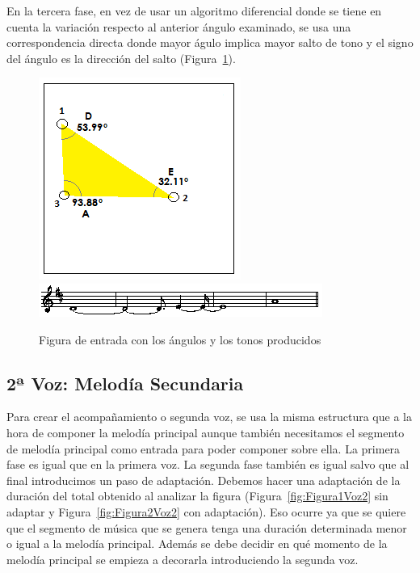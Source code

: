 En la tercera fase, en vez de usar un algoritmo diferencial donde se tiene en cuenta la variación respecto al anterior ángulo examinado, se usa una correspondencia directa donde mayor águlo implica mayor salto de tono y el signo del ángulo es la dirección del salto (Figura~\ref{fig:Figura6Voz1}).

		\begin{figure}[htbp]
		\centering
		\hspace*{0.0in}
		\includegraphics[scale=1]{graphics/simpletest1-F3_2.png}
		\includegraphics[scale=1]{graphics/simpletest1_2-MELpartitura.png}
		\caption{Figura de entrada con los ángulos y los tonos producidos}
		\label{fig:Figura6Voz1}
		\end{figure}


\subsection{2ª Voz: Melodía Secundaria}

Para crear el acompañamiento o segunda voz, se usa la misma estructura que a la hora de componer la melodía principal aunque también necesitamos el segmento de melodía principal como entrada para poder componer sobre ella. 
La primera fase es igual que en la primera voz. La segunda fase también es igual salvo que al final introducimos un paso de adaptación. Debemos hacer una adaptación de la duración del total obtenido al analizar la figura (Figura~\ref{fig:Figura1Voz2} sin adaptar y Figura~\ref{fig:Figura2Voz2} con adaptación). Eso ocurre ya que se quiere que el segmento de música que se genera tenga una duración determinada menor o igual a la melodía principal. Además se debe decidir en qué momento de la melodía principal se empieza a decorarla introduciendo la segunda voz.

